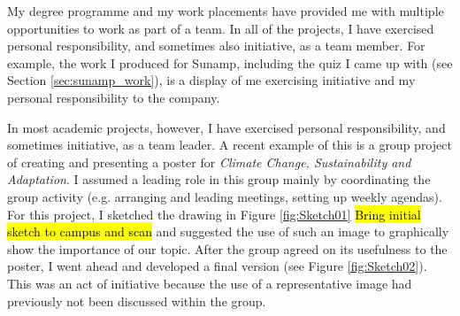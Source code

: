 My degree programme and my work placements have provided me with multiple opportunities to work as part of a team.
In all of the projects, I have exercised personal responsibility, and sometimes also initiative, as a team member.
For example, the work I produced for Sunamp, including the quiz I came up with (see Section \ref{sec:sunamp_work}), is a display of me exercising initiative and my personal responsibility to the company.

In most academic projects, however, I have exercised personal responsibility, and sometimes initiative, as a team leader.
A recent example of this is a group project of creating and presenting a poster for \textit{Climate Change, Sustainability and Adaptation}.
I assumed a leading role in this group mainly by coordinating the group activity (e.g. arranging and leading meetings, setting up weekly agendas).
For this project, I sketched the drawing in Figure \ref{fig:Sketch01} \hl{Bring initial sketch to campus and scan} and suggested the use of such an image to graphically show the importance of our topic.
After the group agreed on its usefulness to the poster, I went ahead and developed a final version (see Figure \ref{fig:Sketch02}).
This was an act of initiative because the use of a representative image had previously not been discussed within the group.


